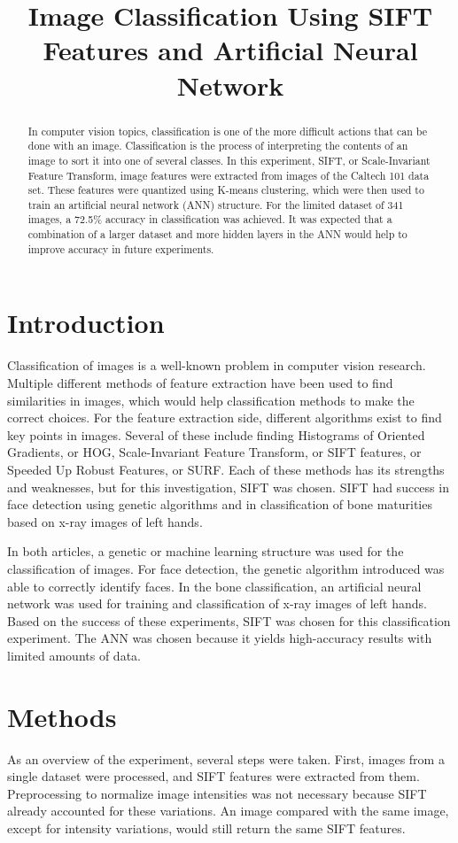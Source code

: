 \documentclass{article}
\title{Image Classification Using SIFT Features and Artificial Neural Network}
\begin{document}
%
\maketitle
%
\begin{abstract}
In computer vision topics, classification is one of the more difficult actions that can be done with an image. Classification is the process of interpreting the contents of an image to sort it into one of several classes. In this experiment, SIFT, or Scale-Invariant Feature Transform, image features were extracted from images of the Caltech 101 data set. These features were quantized using K-means clustering, which were then used to train an artificial neural network (ANN) structure. For the limited dataset of 341 images, a 72.5\% accuracy in classification was achieved. It was expected that a combination of a larger dataset and more hidden layers in the ANN would help to improve accuracy in future experiments.
\end{abstract}
%
\section{Introduction}
\label{sec:intro}
Classification of images is a well-known problem in computer vision research. Multiple different methods of feature extraction have been used to find similarities in images, which would help classification methods to make the correct choices. For the feature extraction side, different algorithms exist to find key points in images. Several of these include finding Histograms of Oriented Gradients, or HOG, Scale-Invariant Feature Transform, or SIFT features, or Speeded Up Robust Features, or SURF. Each of these methods has its strengths and weaknesses, but for this investigation, SIFT was chosen. SIFT had success in face detection using genetic algorithms\cite{faces} and in classification of bone maturities based on x-ray images of left hands\cite{bones}.

In both articles, a genetic or machine learning structure was used for the classification of images. For face detection, the genetic algorithm introduced was able to correctly identify faces\cite{faces}. In the bone classification, an artificial neural network was used for training and classification of x-ray images of left hands\cite{bones}. Based on the success of these experiments, SIFT was chosen for this classification experiment. The ANN was chosen because it yields high-accuracy results with limited amounts of data\cite{bones}.
%
\section{Methods}
\label{sec:methods}
As an overview of the experiment, several steps were taken. First, images from a single dataset were processed, and SIFT features were extracted from them. Preprocessing to normalize image intensities was not necessary because SIFT already accounted for these variations. An image compared with the same image, except for intensity variations, would still return the same SIFT features.
\end{document}
